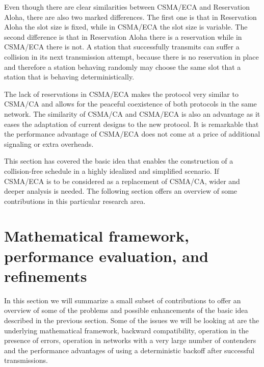 \documentclass[journal]{IEEEtran}
\begin{document}

Even though there are clear similarities between CSMA/ECA and Reservation Aloha, there are also two marked differences.
The first one is that in Reservation Aloha the slot size is fixed, while in CSMA/ECA the slot size is variable.
The second difference is that in Reservation Aloha there is a reservation while in CSMA/ECA there is not.
A station that successfully transmits can suffer a collision in its next transmission attempt, because there is no reservation in place and therefore a station behaving randomly may choose the same slot that a station that is behaving deterministically.

The lack of reservations in CSMA/ECA makes the protocol very similar to CSMA/CA and allows for the peaceful coexistence of both protocols in the same network.
The similarity of CSMA/CA and CSMA/ECA is also an advantage as it eases the adaptation of current designs to the new protocol.
It is remarkable that the performance advantage of CSMA/ECA does not come at a price of additional signaling or extra overheads.


This section has covered the basic idea that enables the construction of a collision-free schedule in a highly idealized and simplified scenario. If CSMA/ECA is to be considered as a replacement of CSMA/CA, wider and deeper analysis is needed. The following section offers an overview of some contributions in this particular research area.

\section{Mathematical framework, performance evaluation, and refinements}
\label{sec:survey}
In this section we will summarize a small subset of contributions to offer an overview of some of the problems and possible enhancements of the basic idea described in the previous section. 
Some of the issues we will be looking at are the underlying mathematical framework, backward compatibility, operation in the presence of errors, operation in networks with a very large number of contenders and the performance advantages of using a deterministic backoff after successful transmissions. 
\end{document}

